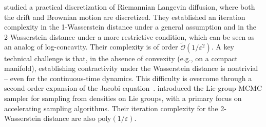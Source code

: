 \cite{cheng2022efficient} studied a practical discretization of Riemannian Langevin diffusion, where both the drift and Brownian motion are discretized. They established an iteration complexity in the 1-Wasserstein distance under a general assumption and in the 
2-Wasserstein distance under a more restrictive condition, which can be seen as an analog of log-concavity. Their complexity is of order $\tilde{\mathcal{O}}(1/\varepsilon^{2})$. A key technical challenge is that, in the absence of convexity (e.g., on a compact manifold), establishing contractivity under the Wasserstein distance is nontrivial -- even for the continuous-time dynamics. This difficulty is overcome through a second-order expansion of the Jacobi equation~\citet[Lemma 29]{cheng2022efficient}. \cite{kong2024convergence} introduced the Lie-group MCMC sampler for sampling from densities on Lie groups, with a primary focus on accelerating sampling algorithms. Their iteration complexity for the 2-Wasserstein distance are also $\text{poly}(1/\varepsilon)$.




